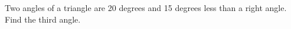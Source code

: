 Two angles of a triangle are 20 degrees and 15 degrees less than a right angle. Find the third angle.
